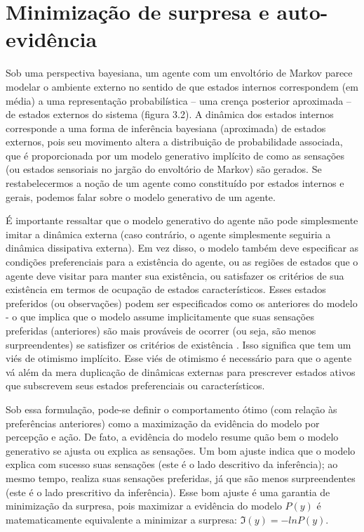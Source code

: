 \documentclass[
  12pt,
]{book}
\begin{document}
\hypertarget{minimizauxe7uxe3o-de-surpresa-e-auto-eviduxeancia}{%
\section{Minimização de surpresa e auto-evidência}\label{minimizauxe7uxe3o-de-surpresa-e-auto-eviduxeancia}}

Sob uma perspectiva bayesiana, um agente com um envoltório de Markov parece modelar o ambiente externo no sentido de que estados internos correspondem (em média) a uma representação probabilística -- uma crença posterior aproximada -- de estados externos do sistema (figura 3.2). A dinâmica dos estados internos corresponde a uma forma de inferência bayesiana (aproximada) de estados externos, pois seu movimento altera a distribuição de probabilidade associada, que é proporcionada por um modelo generativo implícito de como as sensações (ou estados sensoriais no jargão do envoltório de Markov) são gerados. Se restabelecermos a noção de um agente como constituído por estados internos e gerais, podemos falar sobre o modelo generativo de um agente.

É importante ressaltar que o modelo generativo do agente não pode simplesmente imitar a dinâmica externa (caso contrário, o agente simplesmente seguiria a dinâmica dissipativa externa). Em vez disso, o modelo também deve especificar as condições preferenciais para a existência do agente, ou as regiões de estados que o agente deve visitar para manter sua existência, ou satisfazer os critérios de sua existência em termos de ocupação de estados característicos. Esses estados preferidos (ou observações) podem ser especificados como os anteriores do modelo - o que implica que o modelo assume implicitamente que suas sensações preferidas (anteriores) são mais prováveis de ocorrer (ou seja, são menos surpreendentes) se satisfizer os critérios de existência . Isso significa que tem um viés de otimismo implícito. Esse viés de otimismo é necessário para que o agente vá além da mera duplicação de dinâmicas externas para prescrever estados ativos que subscrevem seus estados preferenciais ou característicos.

Sob essa formulação, pode-se definir o comportamento ótimo (com relação às preferências anteriores) como a maximização da evidência do modelo por percepção e ação. De fato, a evidência do modelo resume quão bem o modelo generativo se ajusta ou explica as sensações. Um bom ajuste indica que o modelo explica com sucesso suas sensações (este é o lado descritivo da inferência); ao mesmo tempo, realiza suas sensações preferidas, já que são menos surpreendentes (este é o lado prescritivo da inferência). Esse bom ajuste é uma garantia de minimização da surpresa, pois maximizar a evidência do modelo \(P( y)\) é matematicamente equivalente a minimizar a surpresa: \(ℑ( y)  =  −ln P( y).\)
\end{document}
